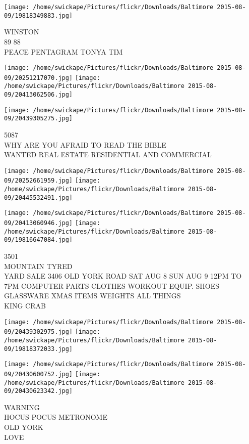 \documentclass[10pt,letterpaper]{article}
\begin{document}
\vspace{0.25in}
\texttt{[image: /home/swickape/Pictures/flickr/Downloads/Baltimore 2015-08-09/19818349883.jpg]}

WINSTON\\
89 88\\
PEACE PENTAGRAM TONYA TIM
\pagebreak

\texttt{[image: /home/swickape/Pictures/flickr/Downloads/Baltimore 2015-08-09/20251217070.jpg]}
\texttt{[image: /home/swickape/Pictures/flickr/Downloads/Baltimore 2015-08-09/20413062506.jpg]}

\vspace{0.25in}
\texttt{[image: /home/swickape/Pictures/flickr/Downloads/Baltimore 2015-08-09/20439305275.jpg]}

5087\\
WHY ARE YOU AFRAID TO READ THE BIBLE\\
WANTED REAL ESTATE RESIDENTIAL AND COMMERCIAL
\pagebreak

\texttt{[image: /home/swickape/Pictures/flickr/Downloads/Baltimore 2015-08-09/20252661959.jpg]}
\texttt{[image: /home/swickape/Pictures/flickr/Downloads/Baltimore 2015-08-09/20445532491.jpg]}

\texttt{[image: /home/swickape/Pictures/flickr/Downloads/Baltimore 2015-08-09/20413060946.jpg]}
\texttt{[image: /home/swickape/Pictures/flickr/Downloads/Baltimore 2015-08-09/19816647084.jpg]}

3501\\
MOUNTAIN TYRED\\
YARD SALE 3406 OLD YORK ROAD SAT AUG 8 SUN AUG 9 12PM TO 7PM COMPUTER PARTS CLOTHES WORKOUT EQUIP. SHOES GLASSWARE XMAS ITEMS WEIGHTS ALL THINGS\\
KING CRAB
\pagebreak

\texttt{[image: /home/swickape/Pictures/flickr/Downloads/Baltimore 2015-08-09/20439302975.jpg]}
\texttt{[image: /home/swickape/Pictures/flickr/Downloads/Baltimore 2015-08-09/19818372033.jpg]}

\texttt{[image: /home/swickape/Pictures/flickr/Downloads/Baltimore 2015-08-09/20430600752.jpg]}
\texttt{[image: /home/swickape/Pictures/flickr/Downloads/Baltimore 2015-08-09/20430623342.jpg]}

WARNING\\
HOCUS POCUS METRONOME\\
OLD YORK\\
LOVE
\pagebreak
\end{document}
